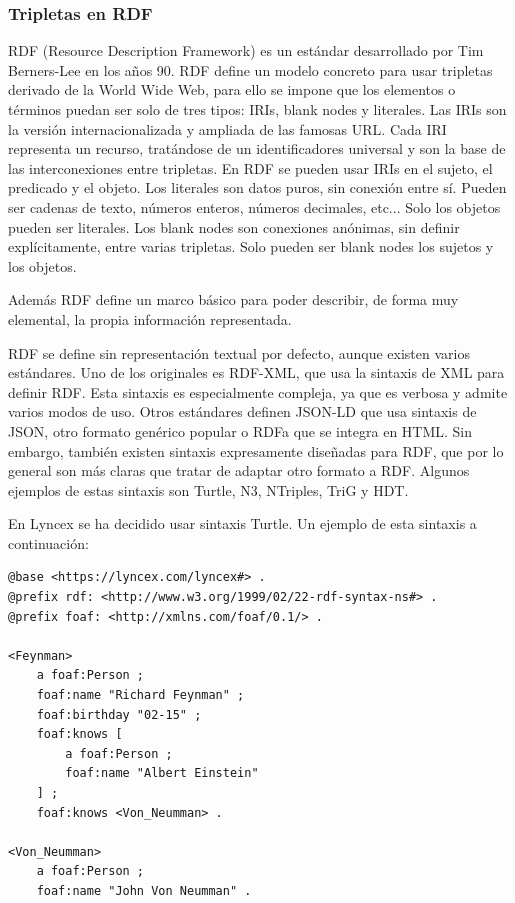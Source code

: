 \documentclass[12pt]{report} %
\begin{document}
\subsubsection{Tripletas en RDF}

RDF (Resource Description Framework) es un estándar desarrollado por Tim Berners-Lee en los años 90.
RDF define un modelo concreto para usar tripletas derivado de la World Wide Web, para ello se impone que los elementos o términos puedan ser solo de tres tipos: IRIs, blank nodes y literales.
Las IRIs son la versión internacionalizada y ampliada de las famosas URL. Cada IRI representa un recurso, tratándose de un identificadores universal y son la base de las interconexiones entre tripletas. En RDF se pueden usar IRIs en el sujeto, el predicado y el objeto.
Los literales son datos puros, sin conexión entre sí. Pueden ser cadenas de texto, números enteros, números decimales, etc... Solo los objetos pueden ser literales.
Los blank nodes son conexiones anónimas, sin definir explícitamente, entre varias tripletas. Solo pueden ser blank nodes los sujetos y los objetos.

Además RDF define un marco básico para poder describir, de forma muy elemental, la propia información representada.

RDF se define sin representación textual por defecto, aunque existen varios estándares. Uno de los originales es RDF-XML\cite{rdfxml}, que usa la sintaxis de XML para definir RDF. Esta sintaxis es especialmente compleja, ya que es verbosa y admite varios modos de uso.
Otros estándares definen JSON-LD\cite{jsonld} que usa sintaxis de JSON, otro formato genérico popular o RDFa\cite{rdfa} que se integra en HTML. Sin embargo, también existen sintaxis expresamente diseñadas para RDF, que por lo general son más claras que tratar de adaptar otro formato a RDF.
Algunos ejemplos de estas sintaxis son Turtle\cite{turtle}, N3\cite{wiki:n3}, NTriples\cite{ntriples}, TriG\cite{trig} y HDT\cite{hdt}.

En Lyncex se ha decidido usar sintaxis Turtle. Un ejemplo de esta sintaxis a continuación:

\begin{lstlisting}[float,floatplacement=H]
@base <https://lyncex.com/lyncex#> .
@prefix rdf: <http://www.w3.org/1999/02/22-rdf-syntax-ns#> .
@prefix foaf: <http://xmlns.com/foaf/0.1/> .

<Feynman>
    a foaf:Person ;
    foaf:name "Richard Feynman" ;
    foaf:birthday "02-15" ;
    foaf:knows [
        a foaf:Person ;
        foaf:name "Albert Einstein"
    ] ;
    foaf:knows <Von_Neumman> .

<Von_Neumman>
    a foaf:Person ;
    foaf:name "John Von Neumman" .
\end{lstlisting}
\end{document}
